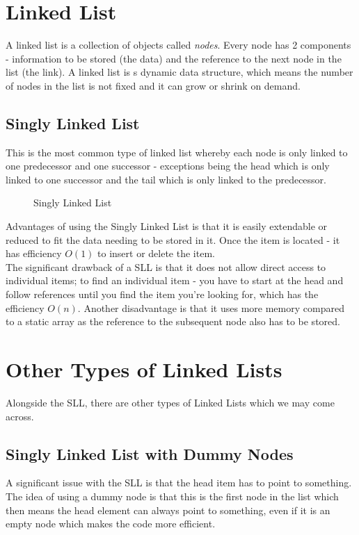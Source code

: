 \section{Linked List}
A linked list is a collection of objects called \textit{nodes}. Every node has 2 components - information to be stored (the data) and the reference to the next node in the list (the link). A linked list is s dynamic data structure, which means the number of nodes in the list is not fixed and it can grow or shrink on demand.
\subsection{Singly Linked List}
This is the most common type of linked list whereby each node is only linked to one predecessor and one successor - exceptions being the head which is only linked to one successor and the tail which is only linked to the predecessor.

\begin{figure}[H]
    \centering
    
    \caption{Singly Linked List}
\end{figure}

Advantages of using the Singly Linked List is that it is easily extendable or reduced to fit the data needing to be stored in it. Once the item is located - it has efficiency $O(1)$ to insert or delete the item.\\

The significant drawback of a SLL is that it does not allow direct access to individual items; to find an individual item - you have to start at the head and follow references until you find the item you're looking for, which has the efficiency $O(n)$. Another disadvantage is that it uses more memory compared to a static array as the reference to the subsequent node also has to be stored.


\section{Other Types of Linked Lists}
Alongside the SLL, there are other types of Linked Lists which we may come across.

\subsection{Singly Linked List with Dummy Nodes}
A significant issue with the SLL is that the head item has to point to something. The idea of using a dummy node is that this is the first node in the list which then means the head element can always point to something, even if it is an empty node which makes the code more efficient. 

